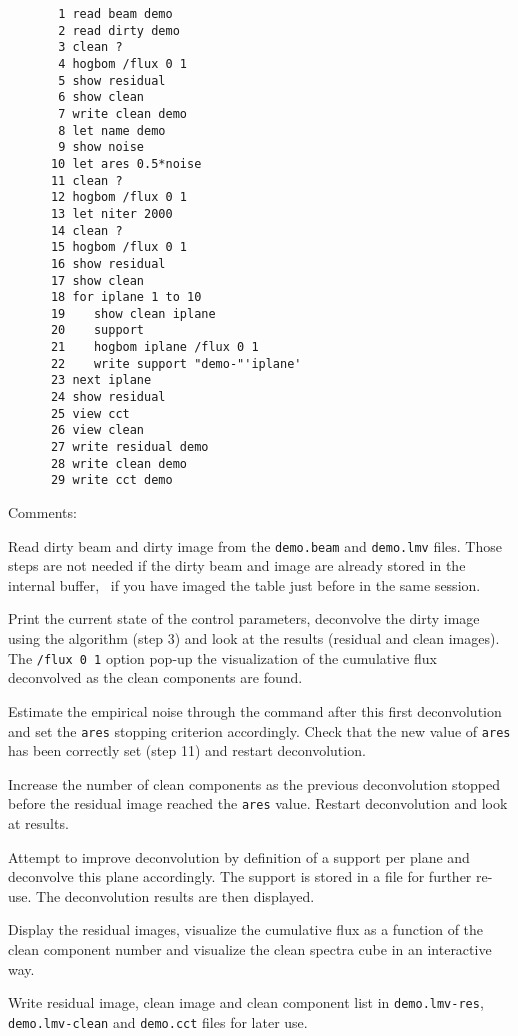 \begin{verbatim}
       1 read beam demo
       2 read dirty demo
       3 clean ?
       4 hogbom /flux 0 1
       5 show residual
       6 show clean
       7 write clean demo
       8 let name demo
       9 show noise
      10 let ares 0.5*noise
      11 clean ?
      12 hogbom /flux 0 1
      13 let niter 2000
      14 clean ?
      15 hogbom /flux 0 1
      16 show residual
      17 show clean
      18 for iplane 1 to 10
      19    show clean iplane
      20    support
      21    hogbom iplane /flux 0 1
      22    write support "demo-"'iplane'
      23 next iplane
      24 show residual
      25 view cct
      26 view clean
      27 write residual demo
      28 write clean demo
      29 write cct demo
\end{verbatim}
Comments:
\begin{description}\itemsep 0pt
\item[Steps 1-2] Read dirty beam and dirty image from the
  \texttt{demo.beam} and \texttt{demo.lmv} files. Those steps are not
  needed if the dirty beam and image are already stored in the internal
  buffer, \ie\ if you have imaged the \uv{} table just before in the same
  \imager{} session.
\item[Steps 3-6] Print the current state of the control parameters,
  deconvolve the dirty image using the  algorithm (step 3) and
  look at the results (residual and clean images).  The \texttt{/flux 0 1}
  option pop-up the visualization of the cumulative flux deconvolved as the
  clean components are found.
\item[Steps 8-12] Estimate the empirical noise through the 
  command after this first deconvolution and set the \texttt{ares} stopping
  criterion accordingly. Check that the new value of \texttt{ares} has been
  correctly set (step 11) and restart deconvolution.
\item[Steps 13-17] Increase the number of clean components as the previous
  deconvolution stopped before the residual image reached the
  \texttt{ares} value. Restart deconvolution and look at results.
\item[Steps 18-23] Attempt to improve deconvolution by definition of a
  support per plane and deconvolve this plane accordingly. The support is
  stored in a file for further re-use. The deconvolution results are then displayed.
\item[Steps 24-26] Display the residual images, visualize the cumulative 
  flux as a function of the clean component number and visualize the clean 
  spectra cube in an interactive way.
\item[Steps 27-29] Write residual image, clean image and clean component
  list in \texttt{demo.lmv-res}, \texttt{demo.lmv-clean} and
  \texttt{demo.cct} files for later use. 
\end{description}
